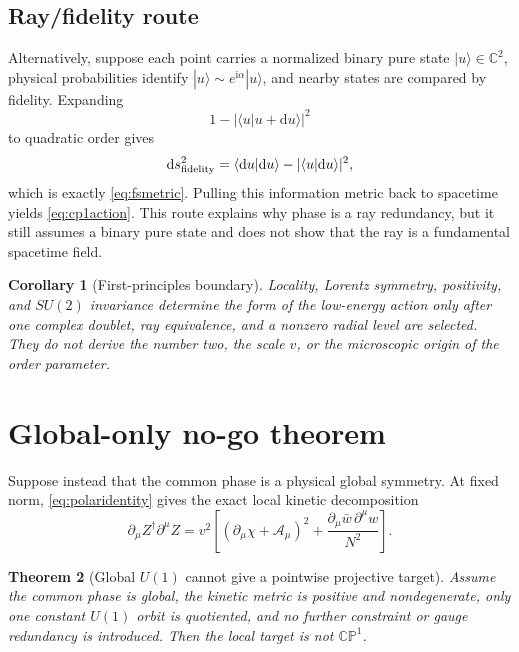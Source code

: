 \documentclass[11pt]{article}
\numberwithin{equation}{section}
\newcommand{\CP}{\mathbb{CP}}
\newcommand{\CC}{\mathbb C}
\newcommand{\dd}{\mathrm d}
\newcommand{\ii}{\mathrm i}
\newtheorem{theorem}{Theorem}[section]
\newtheorem{corollary}[theorem]{Corollary}
\begin{document}
\subsection{Ray/fidelity route}

Alternatively, suppose each point carries a normalized binary pure state
\(|u\rangle\in\CC^2\), physical probabilities identify
\(|u\rangle\sim e^{\ii\alpha}|u\rangle\), and nearby states are compared by
fidelity.  Expanding
\begin{equation}
 1-|\langle u|u+\dd u\rangle|^2
\end{equation}
to quadratic order gives
\begin{equation}
 \dd s_{\rm fidelity}^2
 =\langle\dd u|\dd u\rangle
 -|\langle u|\dd u\rangle|^2,
 \label{eq:fidelity}
\end{equation}
which is exactly \eqref{eq:fsmetric}.  Pulling this information metric back to
spacetime yields \eqref{eq:cp1action}.  This route explains why phase is a ray
redundancy, but it still assumes a binary pure state and does not show that the
ray is a fundamental spacetime field.

\begin{corollary}[First-principles boundary]
Locality, Lorentz symmetry, positivity, and \(SU(2)\) invariance determine the
form of the low-energy action only \emph{after} one complex doublet, ray
equivalence, and a nonzero radial level are selected.  They do not derive the
number two, the scale \(v\), or the microscopic origin of the order parameter.
\end{corollary}

\section{Global-only no-go theorem}

Suppose instead that the common phase is a physical global symmetry.  At fixed
norm, \eqref{eq:polaridentity} gives the exact local kinetic decomposition
\begin{equation}
 \partial_\mu Z^\dagger\partial^\mu Z
 =v^2\left[
 (\partial_\mu\chi+\mathcal A_\mu)^2
 +\frac{\partial_\mu\bar w\,\partial^\mu w}{N^2}
 \right].
 \label{eq:globalkinetic}
\end{equation}

\begin{theorem}[Global \(U(1)\) cannot give a pointwise projective target]
Assume the common phase is global, the kinetic metric is positive and
nondegenerate, only one constant \(U(1)\) orbit is quotiented, and no further
constraint or gauge redundancy is introduced.  Then the local target is not
\(\CP^1\).
\end{theorem}
\end{document}
